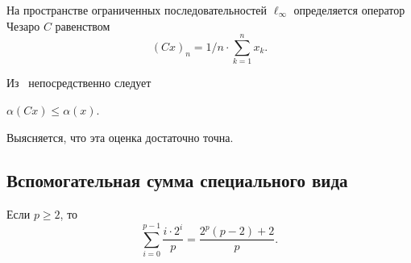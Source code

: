 На пространстве ограниченных последовательностей $\ell_\infty$ определяется оператор Чезаро $C$
равенством
\begin{equation}
	(Cx)_n = {1}/{n} \cdot \sum_{k=1}^n x_k
	.
\end{equation}

Из~\cite[Proposition 4]{semenov2020invariant_noncommutative} непосредственно следует
\begin{theorem}
	\label{thm:alpha_Cx_leq_alpha_x}
	$\alpha(Cx) \leqslant \alpha(x)$.
\end{theorem}
Выясняется, что эта оценка достаточно точна.

\subsection{Вспомогательная сумма специального вида}
\begin{lemma}
	Если $p\geq 2$, то
	\begin{equation}\label{summa_drobey}
		\sum_{i=0}^{p-1} \frac{i \cdot 2^i}{p} = \frac{2^p(p-2) + 2}{p}
		.
	\end{equation}
\end{lemma}


